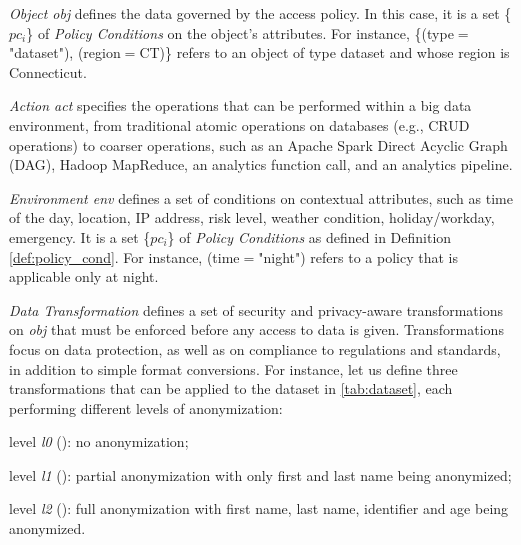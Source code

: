       \textit{Object obj} defines the data governed by the access policy. In this case, it is a set \{$pc_i$\} of \emph{Policy Conditions} on the object's attributes. %
      For instance, \{(type$=$"dataset"), (region$=$CT)\} refers to an object of type dataset and whose region is Connecticut.

      \textit{Action act} specifies the operations that can be performed within a big data environment, from traditional atomic operations on databases (e.g., CRUD operations) to coarser operations, such as an Apache Spark Direct Acyclic Graph (DAG), Hadoop MapReduce, an analytics function call, and an analytics pipeline.

      \textit{Environment env} defines a set of conditions on contextual attributes, such as time of the day, location, IP address, risk level, weather condition, holiday/workday, emergency. It is a set \{$pc_i$\} of \emph{Policy Conditions} as defined in Definition \ref{def:policy_cond}. For instance, (time$=$"night") refers to a policy that is applicable only at night.

      \textit{Data Transformation \TP} defines a set of security and privacy-aware transformations on \textit{obj} that must be enforced before any access to data is given. Transformations focus on data protection, as well as on compliance to regulations and standards, in addition to simple format conversions. For instance, let us define three transformations that can be applied to the dataset in \cref{tab:dataset}, each performing different levels of anonymization:
      \begin{enumerate*}[label=\roman*)]
        \item level \emph{l0} (): no anonymization;
        \item level \emph{l1} (): partial anonymization with only first and last name being anonymized;
        \item level \emph{l2} (): full anonymization with first name, last name, identifier and age being anonymized.
      \end{enumerate*}



